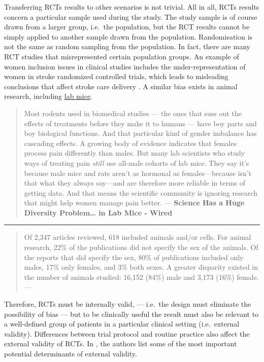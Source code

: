 \documentclass[
]{book}
\begin{document}
Transferring RCTs results to other scenarios is not trivial. All in all, RCTs results concern a particular sample used during the study. The study sample is of course drawn from a larger group, i.e.~the population, but the RCT results cannot be simply applied to another sample drawn from the population. Randomisation is not the same as random sampling from the population. In fact, there are many RCT studies that misrepresented certain population groups. An example of women inclusion issues in clinical studies includes the under-representation of women in stroke randomized controlled trials, which leads to misleading conclusions that affect stroke care delivery \citep{tsivgoulis2017under}. A similar bias exists in animal research, including \href{https://www.wired.com/2016/07/science-huge-diversity-problem-lab-rats/}{lab mice}.

\begin{quote}
Most rodents used in biomedical studies --- the ones that suss out the effects of treatments before they make it to humans --- have boy parts and boy biological functions. And that particular kind of gender imbalance has cascading effects. A growing body of evidence indicates that females process pain differently than males. But many lab scientists who study ways of treating pain \emph{still }use all-male cohorts of lab mice. They say it's because male mice and rats aren't as hormonal as females---because isn't that what they always say---and are therefore more reliable in terms of getting data. And that means the scientific community is ignoring research that might help women manage pain better. --- \textbf{Science Has a Huge Diversity Problem\ldots{} in Lab Mice - Wired}
\end{quote}

\begin{center}\rule{0.5\linewidth}{0.5pt}\end{center}

\begin{quote}
Of 2,347 articles reviewed, 618 included animals and/or cells. For animal research, 22\% of the publications did not specify the sex of the animals. Of the reports that did specify the sex, 80\% of publications included only males, 17\% only females, and 3\% both sexes. A greater disparity existed in the number of animals studied: 16,152 (84\%) male and 3,173 (16\%) female. --- \citep{yoon2014sex}
\end{quote}

Therefore, RCTs must be internally valid, --- i.e.~the design must eliminate the possibility of bias --- but to be clinically useful the result must also be relevant to a well-defined group of patients in a particular clinical setting (i.e.~external validity). Differences between trial protocol and routine practice also affect the external validity of RCTs. In \citep{rothwell2006factors}, the authors list some of the most important potential determinants of external validity.
\end{document}
